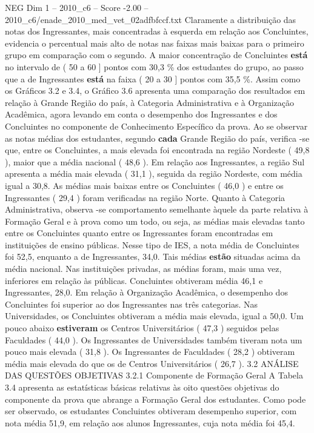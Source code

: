 \begin{textsample}{NEG Dim 1 – 2010\_c6 – Score -2.00 – 2010\_c6/enade\_2010\_med\_vet\_02adfbfccf.txt}
Claramente a distribuição das notas dos Ingressantes, mais concentradas à esquerda em relação aos Concluintes, evidencia o percentual mais alto de notas nas faixas mais baixas para o primeiro grupo em comparação com o segundo.
A maior concentração de Concluintes \textbf{está} no intervalo de ( 50 a 60 ] pontos com 30,3 \% dos estudantes do grupo, ao passo que a de Ingressantes \textbf{está} na faixa ( 20 a 30 ] pontos com 35,5 \%.
Assim como os Gráficos 3.2 e 3.4, o Gráfico 3.6 apresenta uma comparação dos resultados em relação à Grande Região do país, à Categoria Administrativa e à Organização Acadêmica, agora levando em conta o desempenho dos Ingressantes e dos Concluintes no componente de Conhecimento Específico da prova.
Ao se observar as notas médias dos estudantes, segundo \textbf{cada} Grande Região do país, verifica -se que, entre os Concluintes, a mais elevada foi encontrada na região Nordeste ( 49,8 ), maior que a média nacional ( 48,6 ).
Em relação aos Ingressantes, a região Sul apresenta a média mais elevada ( 31,1 ), seguida da região Nordeste, com média igual a 30,8.
As médias mais baixas entre os Concluintes ( 46,0 ) e entre os Ingressantes ( 29,4 ) foram verificadas na região Norte.
Quanto à Categoria Administrativa, observa -se comportamento semelhante àquele da parte relativa à Formação Geral e à prova como um todo, ou seja, as médias mais elevadas tanto entre os Concluintes quanto entre os Ingressantes foram encontradas em instituições de ensino públicas.
Nesse tipo de IES, a nota média de Concluintes foi 52,5, enquanto a de Ingressantes, 34,0.
Tais médias \textbf{estão} situadas acima da média nacional.
Nas instituições privadas, as médias foram, mais uma vez, inferiores em relação às públicas.
Concluintes obtiveram média 46,1 e Ingressantes, 28,0.
Em relação à Organização Acadêmica, o desempenho dos Concluintes foi superior ao dos Ingressantes nas três categorias.
Nas Universidades, os Concluintes obtiveram a média mais elevada, igual a 50,0.
Um pouco abaixo \textbf{estiveram} os Centros Universitários ( 47,3 ) seguidos pelas Faculdades ( 44,0 ).
Os Ingressantes de Universidades também tiveram nota um pouco mais elevada ( 31,8 ).
Os Ingressantes de Faculdades ( 28,2 ) obtiveram média mais elevada do que os de Centros Universitários ( 26,7 ). 3.2 ANÁLISE DAS QUESTÕES OBJETIVAS 3.2.1 Componente de Formação Geral A Tabela 3.4 apresenta as estatísticas básicas relativas às oito questões objetivas do componente da prova que abrange a Formação Geral dos estudantes.
Como pode ser observado, os estudantes Concluintes obtiveram desempenho superior, com nota média 51,9, em relação aos alunos Ingressantes, cuja nota média foi 45,4.

\end{textsample}
